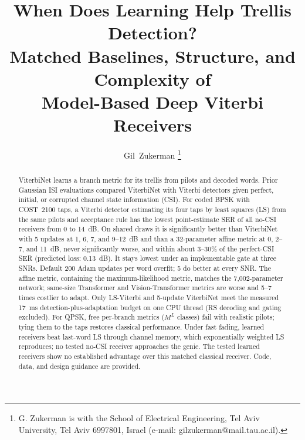 \documentclass[journal]{IEEEtran}
\begin{document}
\title{When Does Learning Help Trellis Detection?\\ Matched Baselines, Structure, and Complexity of\\ Model-Based Deep Viterbi Receivers}

\author{Gil~Zukerman%
\thanks{G. Zukerman is with the School of Electrical Engineering, Tel Aviv University, Tel Aviv 6997801, Israel (e-mail: gilzukerman@mail.tau.ac.il).}}


\maketitle

\begin{abstract}
ViterbiNet learns a branch metric for its trellis from pilots and decoded words. Prior Gaussian ISI evaluations compared ViterbiNet with Viterbi detectors given perfect, initial, or corrupted channel state information (CSI). For coded BPSK with COST~2100 taps, a Viterbi detector estimating its four taps by least squares (LS) from the same pilots and acceptance rule has the lowest point-estimate SER of all no-CSI receivers from 0 to 14~dB. On shared draws it is significantly better than ViterbiNet with 5 updates at 1, 6, 7, and 9--12~dB and than a 32-parameter affine metric at 0, 2--7, and 11~dB, never significantly worse, and within about 3--30\% of the perfect-CSI SER (predicted loss: 0.13~dB). It stays lowest under an implementable gate at three SNRs. Default 200 Adam updates per word overfit; 5 do better at every SNR. The affine metric, containing the maximum-likelihood metric, matches the 7,002-parameter network; same-size Transformer and Vision-Transformer metrics are worse and 5--7 times costlier to adapt. Only LS-Viterbi and 5-update ViterbiNet meet the measured 17~ms detection-plus-adaptation budget on one CPU thread (RS decoding and gating excluded). For QPSK, free per-branch metrics ($M^L$ classes) fail with realistic pilots; tying them to the taps restores classical performance. Under fast fading, learned receivers beat last-word LS through channel memory, which exponentially weighted LS reproduces; no tested no-CSI receiver approaches the genie. The tested learned receivers show no established advantage over this matched classical receiver. Code, data, and design guidance are provided.
\end{abstract}
\end{document}
